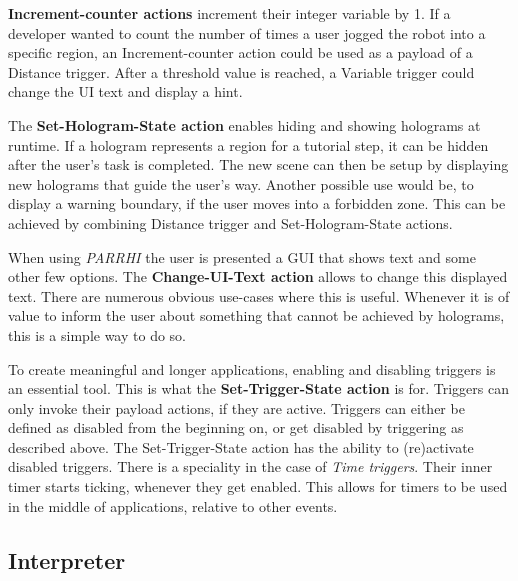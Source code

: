 \textbf{Increment-counter actions} increment their integer variable by 1. If a developer wanted to count the number of times a user jogged the robot into a specific region, an Increment-counter action could be used as a payload of a Distance trigger. After a threshold value is reached, a Variable trigger could change the UI text and display a hint.

The \textbf{Set-Hologram-State action} enables hiding and showing holograms at runtime. If a hologram represents a region for a tutorial step, it can be hidden after the user's task is completed. The new scene can then be setup by displaying new holograms that guide the user's way. Another possible use would be, to display a warning boundary, if the user moves into a forbidden zone. This can be achieved by combining Distance trigger and Set-Hologram-State actions.

When using \textit{PARRHI} the user is presented a GUI that shows text and some other few options. The \textbf{Change-UI-Text action} allows to change this displayed text. There are numerous obvious use-cases where this is useful. Whenever it is of value to inform the user about something that cannot be achieved by holograms, this is a simple way to do so.

To create meaningful and longer applications, enabling and disabling triggers is an essential tool. This is what the \textbf{Set-Trigger-State action} is for. Triggers can only invoke their payload actions, if they are active. Triggers can either be defined as disabled from the beginning on, or get disabled by triggering as described above. The Set-Trigger-State action has the ability to (re)activate disabled triggers. There is a speciality in the case of \textit{Time triggers}. Their inner timer starts ticking, whenever they get enabled. This allows for timers to be used in the middle of applications, relative to other events.

\subsection{Interpreter}
























